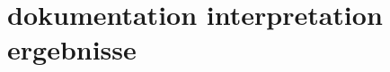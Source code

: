 \section{dokumentation interpretation ergebnisse}\label{sec:04_dokumentation_interpretation_ergebnisse}
